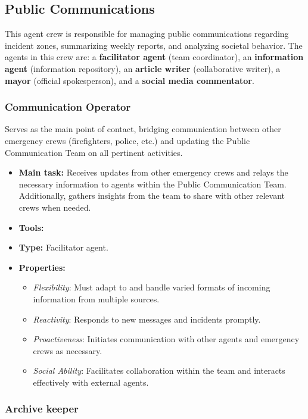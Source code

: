 \subsection{Public Communications}

This agent crew is responsible for managing public communications regarding incident zones, summarizing weekly reports, and analyzing societal behavior. The agents in this crew are: a \textbf{facilitator agent} (team coordinator), an \textbf{information agent} (information repository), an \textbf{article writer} (collaborative writer), a \textbf{mayor} (official spokesperson), and a \textbf{social media commentator}.

\subsubsection{Communication Operator}

Serves as the main point of contact, bridging communication between other emergency crews (firefighters, police, etc.) and updating the Public Communication Team on all pertinent activities.

\begin{itemize}
    \item \textbf{Main task:} Receives updates from other emergency crews and relays the necessary information to agents within the Public Communication Team. Additionally, gathers insights from the team to share with other relevant crews when needed.
    \item \textbf{Tools:} 
    \item \textbf{Type:} Facilitator agent.
    \item \textbf{Properties:}
    \begin{itemize}
        \item \emph{Flexibility}: Must adapt to and handle varied formats of incoming information from multiple sources.
        \item \emph{Reactivity}: Responds to new messages and incidents promptly.
        \item \emph{Proactiveness}: Initiates communication with other agents and emergency crews as necessary.
        \item \emph{Social Ability}: Facilitates collaboration within the team and interacts effectively with external agents.
    \end{itemize}
\end{itemize}

\subsubsection{Archive keeper}

